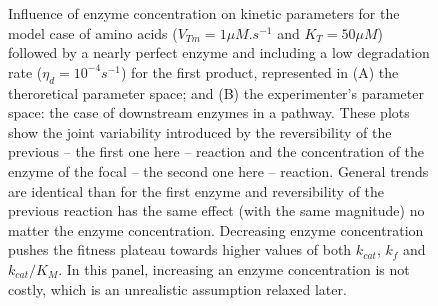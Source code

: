 \begin{figure}[h!]
\begin{minipage}[c]{0.49\linewidth}
\end{minipage}
\caption{Influence of enzyme concentration on kinetic parameters for the model case of amino acids ($V_{Tm}=1\mu M.s^{-1}$ and $K_T=50\mu M$) followed by a nearly perfect enzyme and including a low degradation rate ($\eta_d=10^{-4}s^{-1}$) for the first product, represented in (A) the theroretical parameter space; and (B) the experimenter's parameter space: the case of downstream enzymes in a pathway. These plots show the joint variability introduced by the reversibility of the previous -- the first one here -- reaction and the concentration of the enzyme of the focal -- the second one here -- reaction. General trends are identical than for the first enzyme and reversibility of the previous reaction has the same effect (with the same magnitude) no matter the enzyme concentration. Decreasing enzyme concentration pushes the fitness plateau towards higher values of both $k_{cat}$, $k_f$ and $k_{cat}/K_M$. In this panel, increasing an enzyme concentration is not costly, which is an unrealistic assumption relaxed later.}
\label{fig10-ann}
\end{figure}

